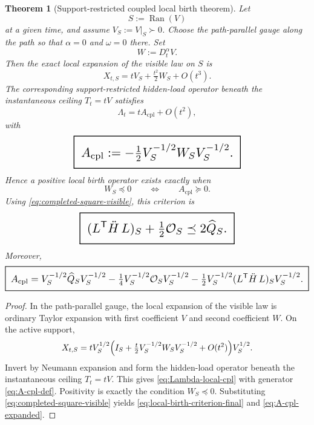 \documentclass[11pt,a4paper]{article}
\numberwithin{equation}{section}
\DeclareMathOperator{\Ran}{Ran}
\newcommand{\geomboxed}[1]{%
  \setlength{\fboxsep}{8pt}%
  \setlength{\fboxrule}{0.9pt}%
  \fbox{\scalebox{1.5}{$\displaystyle #1$}}%
}
\theoremstyle{thmcompact}
\newtheorem{theorem}{Theorem}[section]
\theoremstyle{remark}
\begin{document}
\begin{theorem}[Support-restricted coupled local birth theorem]
\label{thm:coupled-local-birth}
Let
\[
S:=\Ran(V)
\]
at a given time, and assume $V_S:=V|_S\succ0$. Choose the path-parallel gauge along the path so that $\alpha=0$ and $\omega=0$ there. Set
\begin{equation}
W:=D_t^\alpha V.
\label{eq:W-def}
\end{equation}
Then the exact local expansion of the visible law on $S$ is
\begin{equation}
X_{t,S}=tV_S+\tfrac{t^2}{2}W_S+O(t^3).
\label{eq:local-visible-expansion}
\end{equation}
The corresponding support-restricted hidden-load operator beneath the instantaneous ceiling $T_t=tV$ satisfies
\begin{equation}
\Lambda_t=tA_{\mathrm{cpl}}+O(t^2),
\label{eq:Lambda-local-cpl}
\end{equation}
with
\begin{equation}
\geomboxed{
A_{\mathrm{cpl}}
:=
-\tfrac12 V_S^{-1/2}W_SV_S^{-1/2}.
}
\label{eq:A-cpl-def}
\end{equation}
Hence a positive local birth operator exists exactly when
\begin{equation}
W_S\preceq0
\qquad\Longleftrightarrow\qquad
A_{\mathrm{cpl}}\succeq0.
\label{eq:local-birth-criterion-basic}
\end{equation}
Using \eqref{eq:completed-square-visible}, this criterion is
\begin{equation}
\geomboxed{
(L^{\mathsf T}\ddot H\,L)_S+\tfrac12\mathcal O_S
\preceq
2\widehat Q_S.
}
\label{eq:local-birth-criterion-final}
\end{equation}
Moreover,
\begin{equation}
\geomboxed{
A_{\mathrm{cpl}}
=
V_S^{-1/2}\widehat Q_SV_S^{-1/2}
-
\tfrac14 V_S^{-1/2}\mathcal O_SV_S^{-1/2}
-
\tfrac12 V_S^{-1/2}(L^{\mathsf T}\ddot H\,L)_SV_S^{-1/2}.
}
\label{eq:A-cpl-expanded}
\end{equation}
\end{theorem}

\begin{proof}
In the path-parallel gauge, the local expansion of the visible law is ordinary Taylor expansion with first coefficient $V$ and second coefficient $W$. On the active support,
\[
X_{t,S}=tV_S^{1/2}\Bigl(I_S+\tfrac t2 V_S^{-1/2}W_SV_S^{-1/2}+O(t^2)\Bigr)V_S^{1/2}.
\]
Invert by Neumann expansion and form the hidden-load operator beneath the instantaneous ceiling $T_t=tV$. This gives \eqref{eq:Lambda-local-cpl} with generator \eqref{eq:A-cpl-def}. Positivity is exactly the condition $W_S\preceq0$. Substituting \eqref{eq:completed-square-visible} yields \eqref{eq:local-birth-criterion-final} and \eqref{eq:A-cpl-expanded}.
\end{proof}
\end{document}
